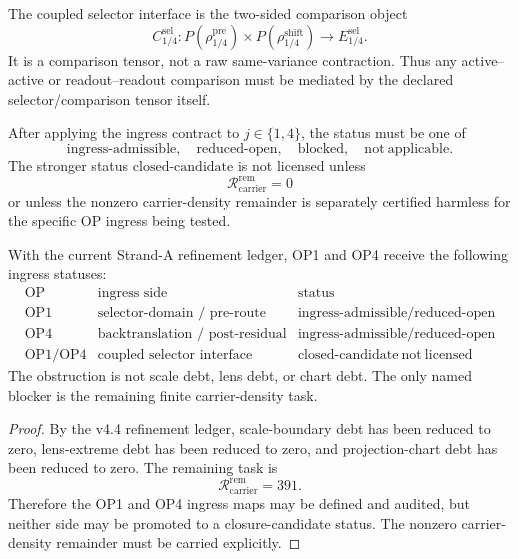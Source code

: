 \begin{definition}
The coupled selector interface is the two-sided comparison object
\[
    C_{1/4}^{\mathrm{sel}}:
    P(\rho_{1/4}^{\mathrm{pre}})
    \times
    P(\rho_{1/4}^{\mathrm{shift}})
    \longrightarrow
    E_{1/4}^{\mathrm{sel}}.
\]
It is a comparison tensor, not a raw same-variance contraction.  Thus any
active--active or readout--readout comparison must be mediated by the declared
selector/comparison tensor itself.
\end{definition}

\begin{definition}
After applying the ingress contract to \(j\in\{1,4\}\), the status must be one
of
\[
    \mathrm{ingress\text{-}admissible},
    \quad
    \mathrm{reduced\text{-}open},
    \quad
    \mathrm{blocked},
    \quad
    \mathrm{not\ applicable}.
\]
The stronger status \(\mathrm{closed\text{-}candidate}\) is not licensed unless
\[
    \mathcal R_{\mathrm{carrier}}^{\mathrm{rem}}=0
\]
or unless the nonzero carrier-density remainder is separately certified
harmless for the specific OP ingress being tested.
\end{definition}

\begin{proposition}
With the current Strand-A refinement ledger, OP1 and OP4 receive the following
ingress statuses:
\[
\begin{array}{c|c|c}
\text{OP} & \text{ingress side} & \text{status}\\
\hline
\mathrm{OP1} & \text{selector-domain / pre-route} &
\mathrm{ingress\text{-}admissible/reduced\text{-}open}\\
\mathrm{OP4} & \text{backtranslation / post-residual} &
\mathrm{ingress\text{-}admissible/reduced\text{-}open}\\
\mathrm{OP1/OP4} & \text{coupled selector interface} &
\mathrm{closed\text{-}candidate\ not\ licensed}
\end{array}
\]
The obstruction is not scale debt, lens debt, or chart debt.  The only named
blocker is the remaining finite carrier-density task.
\end{proposition}

\begin{proof}
By the v4.4 refinement ledger, scale-boundary debt has been reduced to zero,
lens-extreme debt has been reduced to zero, and projection-chart debt has been
reduced to zero.  The remaining task is
\[
    \mathcal R_{\mathrm{carrier}}^{\mathrm{rem}}=391.
\]
Therefore the OP1 and OP4 ingress maps may be defined and audited, but neither
side may be promoted to a closure-candidate status.  The nonzero carrier-density
remainder must be carried explicitly.
\end{proof}

